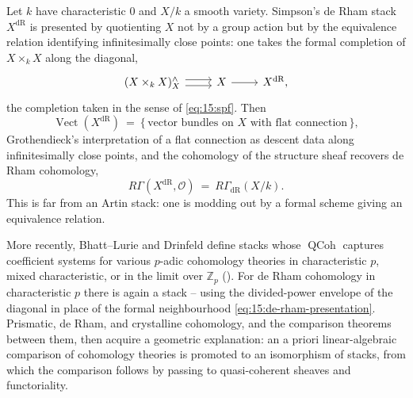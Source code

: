 \begin{example}
\label{ex:15:de-rham}
Let $k$ have characteristic $0$ and $X/k$ a smooth variety. Simpson's de Rham stack
$X^{\mathrm{dR}}$ is presented by quotienting $X$ not by a group action but by the
equivalence relation identifying infinitesimally close points: one takes the formal
completion of $X\times_k X$ along the diagonal,
\begin{equation}
\label{eq:15:de-rham-presentation}
\begin{tikzcd}
(X\times_k X)^{\wedge}_{X} \arrow[r, shift left=0.6ex] \arrow[r, shift right=0.6ex] & X \arrow[r] & X^{\mathrm{dR}},
\end{tikzcd}
\end{equation}
the completion taken in the sense of \eqref{eq:15:spf}. Then
\begin{equation*}
\operatorname{Vect}(X^{\mathrm{dR}})\ =\ \{\,\text{vector bundles on $X$ with flat connection}\,\},
\end{equation*}
Grothendieck's interpretation of a flat connection as descent data along
infinitesimally close points, and the cohomology of the structure sheaf recovers de
Rham cohomology,
\begin{equation*}
R\Gamma(X^{\mathrm{dR}}, \mathcal{O})\ =\ R\Gamma_{\mathrm{dR}}(X/k).
\end{equation*}
This is far from an Artin stack: one is modding out by a formal scheme giving an
equivalence relation.
\end{example}

\begin{remark}
\label{rmk:15:blf}
More recently, Bhatt--Lurie and Drinfeld define stacks whose $\operatorname{QCoh}$
captures coefficient systems for various $p$-adic cohomology theories in
characteristic $p$, mixed characteristic, or in the limit over $\mathbb{Z}_p$
(\cite{drinfeld2024prismatization,bhatt2022absoluteprismaticcohomology}). For de Rham
cohomology in characteristic $p$ there is again a stack -- using the divided-power
envelope of the diagonal in place of the formal neighbourhood
\eqref{eq:15:de-rham-presentation}. Prismatic, de Rham, and crystalline cohomology,
and the comparison theorems between them, then acquire a geometric explanation: an a
priori linear-algebraic comparison of cohomology theories is promoted to an
isomorphism of stacks, from which the comparison follows by passing to quasi-coherent
sheaves and functoriality.
\end{remark}

